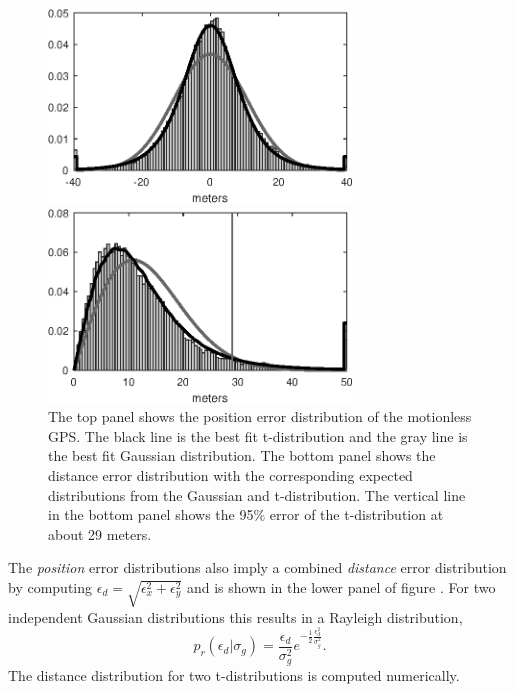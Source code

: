 \documentclass[twocol]{ametsoc}
\begin{document}
\begin{figure}
  \centerline{\includegraphics[width=19pc,angle=0]{motionless_error}}
  \centerline{\includegraphics[width=19pc,angle=0]{motionless_distance_error}} 
  \caption{The top panel shows the position error distribution of the motionless GPS. The black line is the best fit t-distribution and the gray line is the best fit Gaussian distribution. The bottom panel shows the distance error distribution with the corresponding expected distributions from the Gaussian and t-distribution. The vertical line in the bottom panel shows the 95\% error of the t-distribution at about 29 meters.}
  \label{motionless_error}
\end{figure}

The \emph{position} error distributions also imply a combined \emph{distance} error distribution by computing $\epsilon_d = \sqrt{\epsilon_x^2 + \epsilon_y^2}$ and is shown in the lower panel of figure  \label{motionless_error}. For two independent Gaussian distributions this results in a Rayleigh distribution,
\begin{equation}
\label{rayleigh_pdf}
p_r(\epsilon_d|\sigma_g) = \frac{\epsilon_d}{\sigma_g^2 } e^{-\frac{1}{2}\frac{\epsilon_d^2}{\sigma_g^2}}.
\end{equation}
The distance distribution for two t-distributions is computed numerically.
\end{document}
